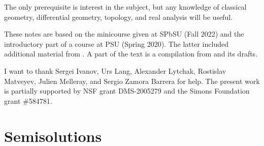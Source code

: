 \documentclass[twoside]{book}
\begin{document}
The only prerequisite is interest in the subject,
but any knowledge of classical geometry, differential geometry, topology, and real analysis will be useful. 

These notes are based on the minicourse given at SPbSU (Fall 2022) and the introductory part of a course at PSU (Spring 2020).
The latter included additional material from \cite{alexander-kapovitch-petrunin-2019,petrunin2020mnfld,nabutovsky}.
A part of the text is a compilation from \cite{alexander-kapovitch-petrunin-2019, alexander-kapovitch-petrunin-2025, petrunin-yashinski, petrunin-2022-PIGTIKAL, petrunin-zamorabarrera} and its drafts.

I want to thank
Sergei Ivanov,
Urs Lang,
Alexander Lytchak,
Rostislav Matveyev,
Julien Melleray,
and Sergio Zamora Barrera for help.
The present work is partially supported by NSF grant DMS-2005279
and the Simons Foundation grant \#584781.

\thispagestyle{empty}
\tableofcontents
\thispagestyle{empty}






%

\backmatter

\chapter{Semisolutions}

{

\footnotesize
\begin{multicols}{2}







\end{multicols}
}


{\small\sloppy


\def\emph{\textit}

\printbibliography[heading=bibintoc]
\fussy
}
\end{document}
